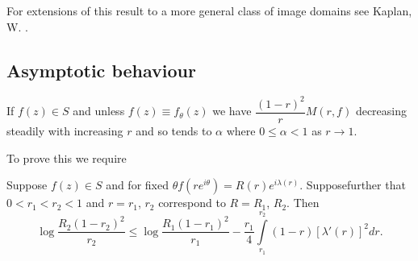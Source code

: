 For extensions of this result to a more general class of image domains
see Kaplan, W. \cite{1}.

\setcounter{section}{3}
\setcounter{subsection}{1}
\subsection{Asymptotic behaviour}\label{part3-sec3.2}

\begin{thm}\label{part3-thm9}
If $f(z)\in S$ and unless $f(z)\equiv f_{\theta}(z)$ we have
$\dfrac{(1-r)^{2}}{r}M(r,f)$ decreasing steadily with increasing $r$
and so tends to $\alpha$ where $0\leq \alpha <1$ as $r\to 1$.
\end{thm}

To prove this we require

\begin{lem}\label{part3-lem3}
Suppose $f(z)\in S$ and for fixed $\theta
f(re^{i\theta})=R(r)e^{i\lambda(r)}$. Suppose\pageoriginale further
that $0<r_{1}<r_{2}<1$ and $r=r_{1}$, $r_{2}$ correspond to $R=R_{1}$,
$R_{2}$. Then
$$
\log \frac{R_{2}(1-r_{2})^{2}}{r_{2}}\leq \log
\frac{R_{1}(1-r_{1})^{2}}{r_{1}}-\frac{r_{1}}{4}\int\limits^{r_{2}}_{r_{1}}(1-r)[\lambda'(r)]^{2}dr. 
$$
\end{lem}

